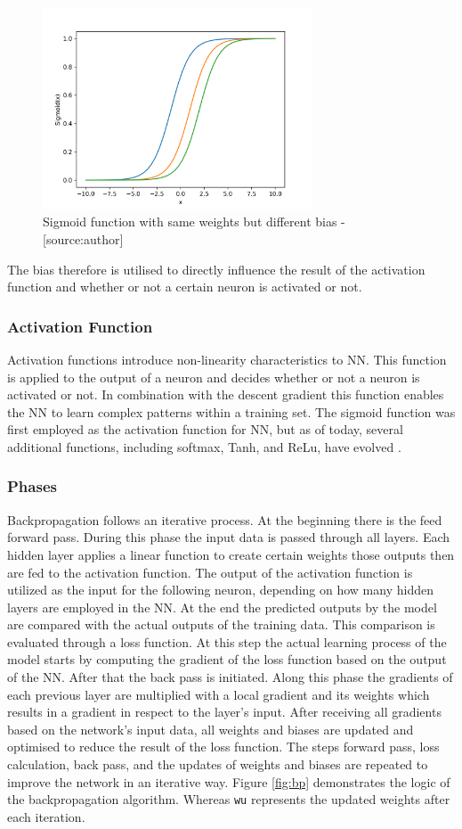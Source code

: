 \begin{figure}[H]
	\centering
		\includegraphics[width=8cm]{images/bias}
	\caption{Sigmoid function with same weights but different bias - [source:author]}
	\label{fig:sig_w_bias}
\end{figure}
The bias therefore is utilised to directly influence the result of the activation function and whether or not a certain neuron is activated or not. 
\subsubsection{Activation Function}
Activation functions introduce non-linearity characteristics to NN. This function is applied to the output of a neuron and decides whether or not a neuron is activated or not.\cite{activation} In combination with the descent gradient this function enables the NN to learn complex patterns within a training set.
The sigmoid function \cite{bp_basic} was first employed as the activation function for NN, but as of today, several additional functions, including softmax, Tanh, and ReLu, have evolved \cite{activation}.

\subsubsection{Phases} 
Backpropagation follows an iterative process. At the beginning there is the feed forward pass. During this phase the input data is passed through all layers. Each hidden layer applies a linear function to create certain weights those outputs then are fed to the activation function. The output of the activation function is utilized as the input for the following neuron, depending on how many hidden layers are employed in the NN. At the end the predicted outputs by the model are compared with the actual outputs of the training data. This comparison is evaluated through a loss function. At this step the actual learning process of the model starts by computing the gradient of the loss function based on the output of the NN. After that the back pass is initiated. Along this phase the gradients of each previous layer are multiplied with a local gradient and its weights which results in a gradient in respect to the layer's input. After receiving all gradients  based on the network's input data, all weights and biases are updated and optimised to reduce the result of the loss function. The steps forward pass, loss calculation, back pass, and the updates of weights and biases are repeated to improve the network in an iterative way. \cite{bp_basic} Figure \ref{fig:bp} demonstrates the logic of the backpropagation algorithm. Whereas \verb|wu| represents the updated weights after each iteration.  

